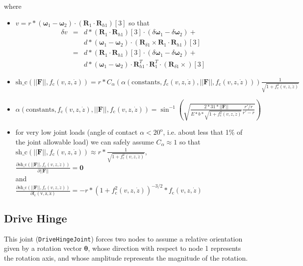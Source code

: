 \documentclass[10pt,dvips,fleqn,subeqn]{report}
\newcommand{\T}[1]{\bm{#1}}
\begin{document}
where
\begin{itemize}
\item
$v=r * (\T \omega_{1}-\T \omega_{2})\cdot(\T R_1\cdot \T R_{h1})[3]$
so that
\begin{eqnarray*}
\delta v &=& d * (\T R_1\cdot \T R_{h1})[3] \cdot (\delta \T \omega_{1}- \delta \T \omega_{2}) +\\
	&& d * (\T \omega_{1}-\T \omega_{2})\cdot (\T R_{\delta 1} \times \T R_1 \cdot \T R_{h1})[3]\\
	&=& d * (\T R_1\cdot \T R_{h1})[3] \cdot (\delta \T \omega_{1}- \delta \T \omega_{2}) +\\
	&& d * (\T \omega_{1}-\T \omega_{2})\cdot \T R_{h1}^T \cdot \T R_1^T \cdot (\T R_{\delta 1} \times )[3]
\end{eqnarray*}
\item
$
\mathrm{sh\_c}(||\T F||, f_{\mathrm{c}}(v,z,\dot{z}))=
r * 
C_\alpha(
	\alpha(\mathrm{constants},
		f_{\mathrm{c}}(v,z,\dot{z}),
		||\T F||,
		f_{\mathrm{c}}(v,z,\dot{z})
	)
) 
\frac{\displaystyle 1}{\displaystyle \sqrt{1+f_{\mathrm{c}}^2(v,z,\dot{z})}}
$
\item
$
\alpha(\mathrm{constants},
	f_{\mathrm{c}}(v,z,\dot{z}),
	||\T F||,
	f_{\mathrm{c}}(v,z,\dot{z})
) =
\sin^{-1}\left(
	\sqrt{
		\frac{\displaystyle 2*31*||\T F||}
			{\displaystyle E*b*\sqrt{1+f_{\mathrm{c}}^2(v,z,\dot{z})}}
		\frac{\displaystyle r'/r}
			{\displaystyle r'-r}
	}
\right)
$
\item for very low joint loads (angle of contact $\alpha< 20^{\mathrm{o}}$,
i.e. about less that 1\% of the joint allowable load)
we can safely assume $C_\alpha\approx 1$
so that\\ 
$
\mathrm{sh\_c}(||\T F||, f_{\mathrm{c}}(v,z,\dot{z}))\approx
r * 
\frac{\displaystyle 1}{\displaystyle \sqrt{1+f_{\mathrm{c}}^2(v,z,\dot{z})}}
$,\\

$
\frac{\displaystyle\partial \mathrm{sh\_c}(||\T F||, f_{\mathrm{c}}(v,z,\dot{z}))}
	{\displaystyle \partial ||\T F||} = \T 0
$\\
and\\
$
\frac{\displaystyle\partial \mathrm{sh\_c}(||\T F||, f_{\mathrm{c}}(v,z,\dot{z}))}
	{\displaystyle\partial \mathrm{f_{\mathrm{c}}(v,z,\dot{z})}} =
	-r * (1+f_{\mathrm{c}}^2(v,z,\dot{z}))^{-3/2}*f_{\mathrm{c}}(v,z,\dot{z})
$
\end{itemize}




\subsection{Drive Hinge}
This joint (\texttt{DriveHingeJoint}) forces two nodes to assume a relative orientation
given by a rotation vector $\T{\theta}$, whose direction with respect
to node 1 represents the rotation axis, and whose amplitude represents 
the magnitude of the rotation.
\end{document}
